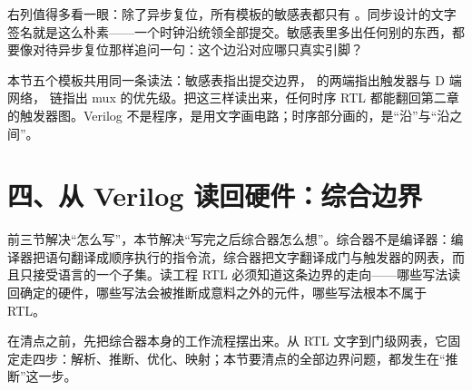 右列值得多看一眼：除了异步复位，所有模板的敏感表都只有 。同步设计的文字签名就是这么朴素——一个时钟沿统领全部提交。敏感表里多出任何别的东西，都要像对待异步复位那样追问一句：这个边沿对应哪只真实引脚？

本节五个模板共用同一条读法：敏感表指出提交边界，\code{<=} 的两端指出触发器与 D 端网络， 链指出 mux 的优先级。把这三样读出来，任何时序 RTL 都能翻回第二章的触发器图。Verilog 不是程序，是用文字画电路；时序部分画的，是“沿”与“沿之间”。

\section{四、从 Verilog 读回硬件：综合边界}

前三节解决“怎么写”，本节解决“写完之后综合器怎么想”。综合器不是编译器：编译器把语句翻译成顺序执行的指令流，综合器把文字翻译成门与触发器的网表，而且只接受语言的一个子集。读工程 RTL 必须知道这条边界的走向——哪些写法读回确定的硬件，哪些写法会被推断成意料之外的元件，哪些写法根本不属于 RTL。

在清点之前，先把综合器本身的工作流程摆出来。从 RTL 文字到门级网表，它固定走四步：解析、推断、优化、映射；本节要清点的全部边界问题，都发生在“推断”这一步。

